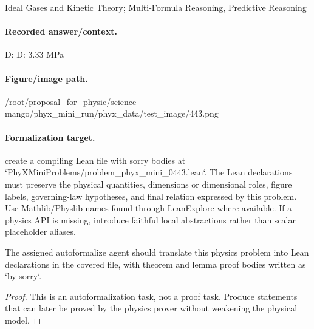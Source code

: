 Ideal Gases and Kinetic Theory; Multi-Formula Reasoning, Predictive Reasoning

\paragraph{Recorded answer/context.}
D: D: 3.33 MPa

\paragraph{Figure/image path.}
/root/proposal\_for\_physic/science-mango/phyx\_mini\_run/phyx\_data/test\_image/443.png

\paragraph{Formalization target.}
create a compiling Lean file with sorry bodies at `PhyXMiniProblems/problem\_phyx\_mini\_0443.lean`. The Lean declarations must preserve the physical quantities, dimensions or dimensional roles, figure labels, governing-law hypotheses, and final relation expressed by this problem.
Use Mathlib/Physlib names found through LeanExplore where available. If a physics API is missing, introduce faithful local abstractions rather than scalar placeholder aliases.

\begin{theorem}
\label{thm:physics:phyx_mini_0443:target}
The assigned autoformalize agent should translate this physics problem into Lean declarations in the covered file, with theorem and lemma proof bodies written as `by sorry`.
\end{theorem}
\begin{proof}
This is an autoformalization task, not a proof task. Produce statements that can later be proved by the physics prover without weakening the physical model.
\end{proof}

